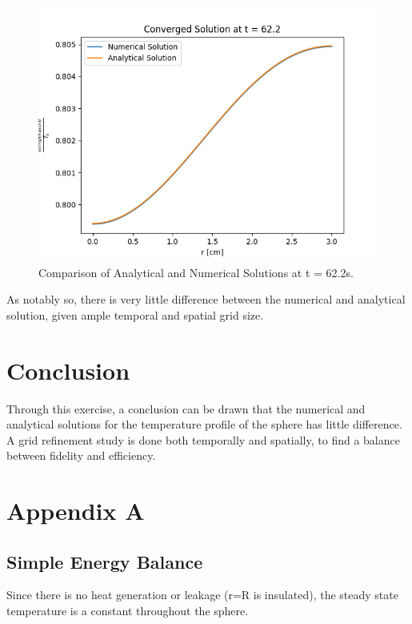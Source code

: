 \documentclass[12pt,letterpaper]{article}
\begin{document}
\begin{figure}[htbp!]
  \begin{center}
    \includegraphics[scale=0.7]{conv_622s.png}
  \end{center}
  \caption{Comparison of Analytical and Numerical Solutions at t = 62.2s.}
  \label{fig:conv_622}
\end{figure}

As notably so, there is very little difference between the numerical and analytical
solution, given ample temporal and spatial grid size. 


\section*{Conclusion}
Through this exercise, a conclusion can be drawn that the numerical
and analytical solutions for the temperature profile of the sphere
has little difference. A grid refinement study is done both temporally
and spatially, to find a balance between fidelity and efficiency. 

\pagebreak
\section*{Appendix A}

\subsection*{Simple Energy Balance}
Since there is no heat generation or leakage (r=R is insulated), 
the steady state temperature is a constant throughout the sphere.
\end{document}
